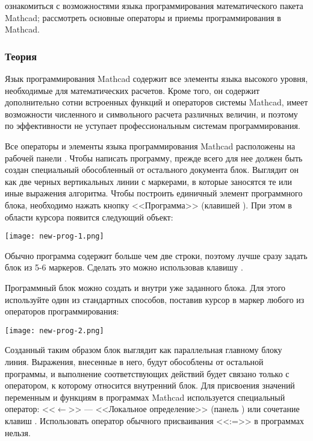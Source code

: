 
\goal ознакомиться с возможностями языка программирования математического пакета Mathcad; рассмотреть основные операторы и приемы программирования в Mathcad.

\subsubsection{Теория}
Язык программирования Mathcad содержит все элементы языка высокого уровня, необходимые для математических расчетов. Кроме того, он содержит дополнительно сотни встроенных функций и операторов системы Mathcad, имеет возможности численного и символьного расчета различных величин, и поэтому по эффективности не уступает профессиональным системам программирования.

Все операторы и элементы языка программирования Mathcad расположены на рабочей панели . 
Чтобы написать программу, прежде всего для нее должен быть создан специальный обособленный от остального документа блок. Выглядит он как две черных вертикальных линии с маркерами, в которые заносятся те или иные выражения алгоритма. Чтобы построить единичный элемент программного блока, необходимо нажать кнопку <<Программа>> (клавишей \keys{]}). При этом в области курсора появится следующий объект:
\begin{center}
	\texttt{[image: new-prog-1.png]}
\end{center}

Обычно программа содержит больше чем две строки, поэтому лучше сразу задать блок из 5-6 маркеров. Сделать это можно использовав клавишу \keys{\enter}.

Программный блок можно создать и внутри уже заданного блока. Для этого используйте один из стандартных способов, поставив курсор в маркер любого из операторов программирования:
\begin{center}
	\texttt{[image: new-prog-2.png]}
\end{center}

Созданный таким образом блок выглядит как параллельная главному блоку линия. Выражения, внесенные в него, будут обособлены от остальной программы, и выполнение соответствующих действий будет связано только с оператором, к которому относится внутренний блок.
Для присвоения значений переменным и функциям в программах Mathcad используется специальный оператор: <<$\leftarrow$>> --- <<Локальное определение>> (панель ) или сочетание клавиш \keys{\shift + [} . Использовать оператор обычного присваивания <<:=>> в программах нельзя.

